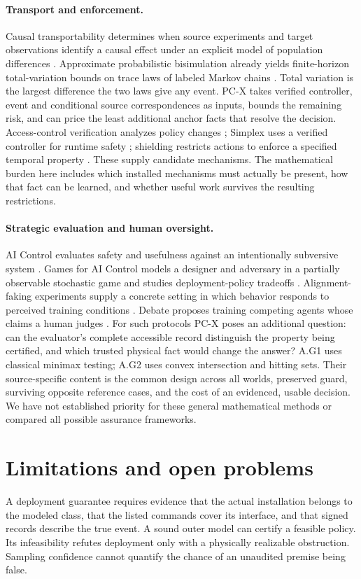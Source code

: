 \paragraph{Transport and enforcement.}
Causal transportability determines when source experiments and target observations identify a causal effect under an explicit model of population differences \citep{pearl}. Approximate probabilistic bisimulation already yields finite-horizon total-variation bounds on trace laws of labeled Markov chains \citep{bian}. Total variation is the largest difference the two laws give any event. PC-X takes verified controller, event and conditional source correspondences as inputs, bounds the remaining risk, and can price the least additional anchor facts that resolve the decision. Access-control verification analyzes policy changes \citep{fisler}; Simplex uses a verified controller for runtime safety \citep{simplex}; shielding restricts actions to enforce a specified temporal property \citep{shield}. These supply candidate mechanisms. The mathematical burden here includes which installed mechanisms must actually be present, how that fact can be learned, and whether useful work survives the resulting restrictions.

\paragraph{Strategic evaluation and human oversight.}
AI Control evaluates safety and usefulness against an intentionally subversive system \citep{control}. Games for AI Control models a designer and adversary in a partially observable stochastic game and studies deployment-policy tradeoffs \citep{games}. Alignment-faking experiments supply a concrete setting in which behavior responds to perceived training conditions \citep{faking}. Debate proposes training competing agents whose claims a human judges \citep{debate}. For such protocols PC-X poses an additional question: can the evaluator's complete accessible record distinguish the property being certified, and which trusted physical fact would change the answer? A.G1 uses classical minimax testing; A.G2 uses convex intersection and hitting sets. Their source-specific content is the common design across all worlds, preserved guard, surviving opposite reference cases, and the cost of an evidenced, usable decision. We have not established priority for these general mathematical methods or compared all possible assurance frameworks.

\section{Limitations and open problems}\label{sec:limits}
A deployment guarantee requires evidence that the actual installation belongs to the modeled class, that the listed commands cover its interface, and that signed records describe the true event. A sound outer model can certify a feasible policy. Its infeasibility refutes deployment only with a physically realizable obstruction. Sampling confidence cannot quantify the chance of an unaudited premise being false.

